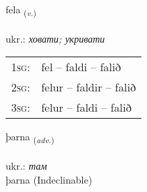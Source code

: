 \documentclass[frontgrid, backgrid]{flacards}\usepackage[]{graphicx}\usepackage[]{xcolor}
\begin{document}
\renewcommand{\flhead}{\vskip5pt \fboxsep=0pt {\small\bfseries\footnotesize Sagnorð | дієслово}}
\renewcommand{\fcfoot}{\vskip5pt \fboxsep=0pt \hspace{2pt}{\small\bfseries\footnotesize 1K}}

\renewcommand{\blhead}{\vskip5pt {\small\bfseries\footnotesize Sagnorð | дієслово }}
\renewcommand{\bcfoot}{\vskip5pt \hspace{2pt}{\small\bfseries\footnotesize 1K}}


{fela \small{\textsubscript{(\textit{v.})}} \\[1ex] %
\textphonetic{[fɛːla]} \\
ukr.: \emph{ховати; укривати} \\  [2ex]
\renewcommand*{\arraystretch}{0.8}
\begin{tabular}{p{1cm}l}
\textsc{1sg}: & fel -- faldi -- falið \\ 
\textsc{2sg}: & felur -- faldir -- falið \\ 
\textsc{3sg}: & felur -- faldi -- falið \\ 
\end{tabular}
}


\renewcommand{\flhead}{\vskip5pt \fboxsep=0pt {\small\bfseries\footnotesize Atviksorð | прислівник}}
\renewcommand{\fcfoot}{\vskip5pt \fboxsep=0pt \hspace{2pt}{\small\bfseries\footnotesize 1K}}

\renewcommand{\blhead}{\vskip5pt {\small\bfseries\footnotesize Atviksorð | прислівник }}
\renewcommand{\bcfoot}{\vskip5pt \hspace{2pt}{\small\bfseries\footnotesize 1K}}


{þarna \small{\textsubscript{(\textit{adv.})}} \\[1ex]
\textphonetic{[θartna]} \\
ukr.: \emph{там} \\  [2ex]
þarna (Indeclinable)}

\renewcommand{\flhead}{\vskip5pt \fboxsep=0pt {\small\bfseries\footnotesize Lýsingarorð | прикметник}}
\renewcommand{\fcfoot}{\vskip5pt \fboxsep=0pt \hspace{2pt}{\small\bfseries\footnotesize 1K}}
\end{document}
